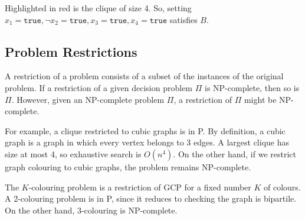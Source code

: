 \documentclass[a4paper, openany]{memoir}
\begin{document}
\begin{figure}[H]
\end{figure}
\noindent Highlighted in red is the clique of size 4. So, setting $x_1 = \texttt{true}, \lnot x_2 = \texttt{true}, x_3 = \texttt{true}, x_4 = \texttt{true}$ satisfies $B$.

\subsection{Problem Restrictions}
A restriction of a problem consists of a subset of the instances of the original problem. If a restriction of a given decision problem $\Pi$ is NP-complete, then so is $\Pi$. However, given an NP-complete problem $\Pi$, a restriction of $\Pi$ might be NP-complete. 

For example, a clique restricted to cubic graphs is in P. By definition, a cubic graph is a graph in which every vertex belongs to 3 edges. A largest clique has size at most 4, so exhaustive search is $O(n^4)$. On the other hand, if we restrict graph colouring to cubic graphs, the problem remains NP-complete.

The $K$-colouring problem is a restriction of GCP for a fixed number $K$ of colours. A 2-colouring problem is in P, since it reduces to checking the graph is bipartile. On the other hand, 3-colouring is NP-complete. 
\end{document}
